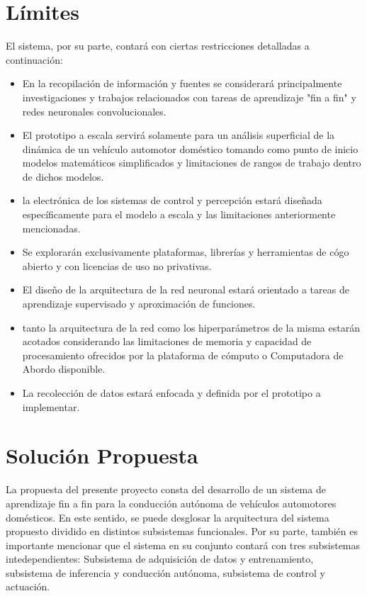 \documentclass[12pt,letterpaper]{article}
\begin{document}
\section{Límites}
El sistema, por su parte, contará con ciertas restricciones detalladas a 
continuación:
\begin{itemize}
    \item En la recopilación de información y fuentes se 
    considerará principalmente investigaciones y trabajos relacionados
    con tareas de aprendizaje "fin a fin" y redes neuronales convolucionales.
    \item El prototipo a escala servirá solamente para un análisis superficial 
    de la dinámica de un vehículo automotor doméstico tomando como punto 
    de inicio modelos matemáticos simplificados y limitaciones de rangos de trabajo dentro 
    de dichos modelos.
    \item la electrónica de los sistemas de control y percepción estará 
    diseñada específicamente para el modelo a escala y las limitaciones anteriormente
    mencionadas.
    \item Se explorarán exclusivamente plataformas, librerías y herramientas
    de cógo abierto y con licencias de uso no privativas.
    \item El diseño de la arquitectura de la red neuronal estará orientado a 
    tareas de aprendizaje supervisado y aproximación de funciones.
    \item tanto la arquitectura de la red como los hiperparámetros de 
    la misma estarán acotados considerando las limitaciones de memoria y capacidad 
    de procesamiento ofrecidos por la plataforma de cómputo o Computadora
    de Abordo disponible.
    \item La recolección de datos estará enfocada y definida por el prototipo
    a implementar.
\end{itemize}

\section{Solución Propuesta}

La propuesta del presente proyecto consta del desarrollo de un sistema de aprendizaje
fin a fin para la conducción autónoma de vehículos automotores domésticos. En este
sentido, se puede desglosar la arquitectura del sistema propuesto dividido en 
distintos subsistemas funcionales.
Por su parte, también es importante mencionar que el sistema en su conjunto contará 
con tres subsistemas intedependientes: Subsistema de adquisición de datos y 
entrenamiento, subsistema de inferencia y conducción autónoma, subsistema de control 
y actuación.
\end{document}
